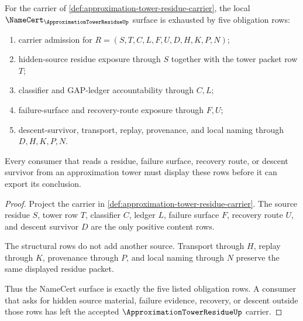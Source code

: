 \begin{theorem}
\label{thm:approximation-tower-residue-namecert-obligations}
For the carrier of \autoref{def:approximation-tower-residue-carrier}, the local $\NameCert_{\ApproximationTowerResidueUp}$ surface is exhausted by five obligation rows:
\begin{enumerate}
\item carrier admission for $R=(S,T,C,L,F,U,D,H,K,P,N)$;
\item hidden-source residue exposure through $S$ together with the tower packet row $T$;
\item classifier and GAP-ledger accountability through $C,L$;
\item failure-surface and recovery-route exposure through $F,U$;
\item descent-survivor, transport, replay, provenance, and local naming through $D,H,K,P,N$.
\end{enumerate}
Every consumer that reads a residue, failure surface, recovery route, or descent survivor from an approximation tower must display these rows before it can export its conclusion.
\end{theorem}
\begin{proof}
Project the carrier in \autoref{def:approximation-tower-residue-carrier}. The source residue $S$, tower row $T$, classifier $C$, ledger $L$, failure surface $F$, recovery route $U$, and descent survivor $D$ are the only positive content rows.

The structural rows do not add another source. Transport through $H$, replay through $K$, provenance through $P$, and local naming through $N$ preserve the same displayed residue packet.

Thus the NameCert surface is exactly the five listed obligation rows. A consumer that asks for hidden source material, failure evidence, recovery, or descent outside those rows has left the accepted $\ApproximationTowerResidueUp$ carrier.
\end{proof}

